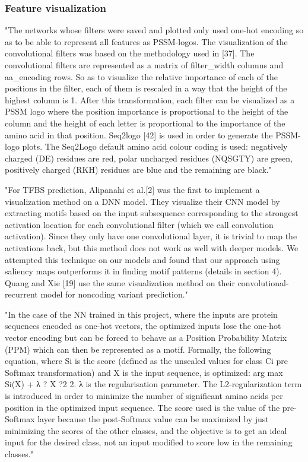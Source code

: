 		\subsubsection{Feature visualization}
		"The networks whose filters were saved and plotted only used one-hot encoding so as to be able to represent all features as PSSM-logos. The visualization of the convolutional filters was based on the methodology used in [37]. The convolutional filters are represented as a matrix of filter\_width columns and aa\_encoding rows. So as to visualize the relative importance of each of the positions in the filter, each of them is rescaled in a way that the height of the highest column is 1. After this transformation, each filter can be visualized as a PSSM logo where the position importance is proportional to the height of the column and the height of each letter is proportional to the importance of the amino acid in that position. Seq2logo [42] is used in order to generate the PSSM-logo plots. The Seq2Logo default amino acid colour coding is used: negatively charged (DE) residues are red, polar uncharged residues (NQSGTY) are green, positively charged (RKH) residues are blue and the remaining are black." \cite{Fontal2017}

		"For TFBS prediction, Alipanahi et al.[2] was the first to implement a visualization method on a DNN model. They visualize their CNN model by extracting motifs based on the input subsequence corresponding to the strongest activation location for each convolutional filter (which we call convolution activation). Since they only have one convolutional layer, it is trivial to map the activations back, but this method does not work as well with deeper models. We attempted this technique on our models and found that our approach using saliency maps outperforms it in finding motif patterns (details in section 4). Quang and Xie [19] use the same visualization method on their convolutional-recurrent model for noncoding variant prediction." \cite{Lanchantin2016}

		"In the case of the NN trained in this project, where the inputs are protein sequences encoded as one-hot vectors, the optimized inputs lose the one-hot vector encoding but can be forced to behave as a Position Probability Matrix (PPM) which can then be represented as a motif. Formally, the following equation, where Si is the score (defined as the unscaled values for class Ci pre Softmax transformation) and X is the input sequence, is optimized:
		arg max Si(X) + λ ? X ?2 2.
		λ is the regularisation parameter. The L2-regularization term is introduced in order to minimize the number of significant amino acids per position in the optimized input sequence. The score used is the value of the pre-Softmax layer because the post-Softmax value can be maximized by just minimizing the scores of the other classes, and the objective is to get an ideal input for the desired class, not an input modified to score low in the remaining classes." \cite{Fontal2017}
		
